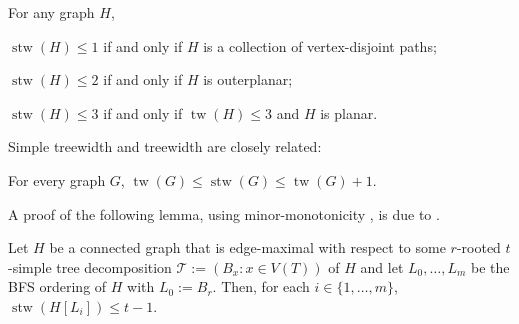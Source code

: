 \documentclass[kpfonts]{patmorin}
\DeclareMathOperator{\tw}{tw}
\DeclareMathOperator{\stw}{stw}
\theoremstyle{named}
\begin{document}
\begin{lem}\label{simple-small-cases}
    For any graph $H$,
    \begin{compactenum}[(i)]
        \item $\stw(H)\le 1$ if and only if $H$ is a collection of vertex-disjoint paths;
        \item $\stw(H)\le 2$ if and only if $H$ is outerplanar;
        \item $\stw(H)\le 3$ if and only if $\tw(H)\le 3$ and $H$ is planar.
    \end{compactenum}
\end{lem}

Simple treewidth and treewidth are closely related:

\begin{lem}\label{simple-treewidth-vs-treewidth}
    For every graph $G$, $\tw(G)\le \stw(G)\le \tw(G)+1$.
\end{lem}

%

A proof of the following lemma, using minor-monotonicity \cite[Theorem~5.2]{wulf:stacked}, is due to \citet{wood:personal}.

\begin{lem}\label{simple-bfs-layers}
    Let $H$ be a connected graph that is edge-maximal with respect to some $r$-rooted $t$-simple tree decomposition $\mathcal{T}:=(B_x:x\in V(T))$ of $H$ and let $L_0,\ldots,L_m$ be the BFS ordering of $H$ with $L_0:=B_r$.   Then, for each $i\in\{1,\ldots,m\}$, $\stw(H[L_i])\le t-1$.
\end{lem}
\end{document}
